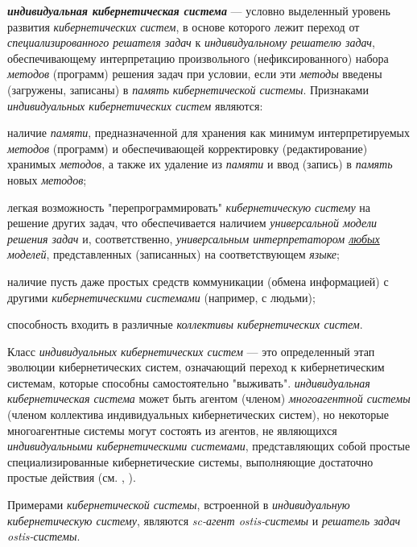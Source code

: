 \textbf{\textit{индивидуальная кибернетическая система}} --- условно выделенный уровень развития \textit{кибернетических систем}, в основе которого лежит переход от \textit{специализированного решателя задач} к \textit{индивидуальному решателю задач}, обеспечивающему интерпретацию произвольного (нефиксированного) набора \textit{методов} (программ) решения задач при условии, если эти \textit{методы} введены (загружены, записаны) в \textit{память} \textit{кибернетической системы}.
Признаками \textit{индивидуальных кибернетических систем} являются:
\begin{textitemize}
    \item наличие \textit{памяти}, предназначенной для хранения как минимум интерпретируемых \textit{методов}	(программ)  и обеспечивающей корректировку (редактирование) хранимых \textit{методов}, а также их удаление из	\textit{памяти} и ввод (запись) в \textit{память} новых \textit{методов};
    \item легкая возможность "перепрограммировать"{} \textit{кибернетическую систему} на решение других задач, что обеспечивается наличием \textit{универсальной модели решения задач} и, соответственно, \textit{универсальным интерпретатором \uline{любых} моделей}, представленных (записанных) на соответствующем \textit{языке};
    \item наличие пусть даже простых средств коммуникации (обмена информацией) с другими \textit{кибернетическими системами} (например, с людьми);
    \item способность входить в различные \textit{коллективы кибернетических систем}.
\end{textitemize}

Класс \textit{индивидуальных кибернетических систем} — это определенный этап эволюции кибернетических систем, означающий переход к кибернетическим системам, которые способны самостоятельно "выживать"{}. \textit{индивидуальная кибернетическая система} может быть агентом (членом) \textit{многоагентной системы} (членом коллектива индивидуальных кибернетических систем), но некоторые многоагентные системы могут состоять из агентов, не являющихся \textit{индивидуальными кибернетическими системами}, представляющих собой простые специализированные кибернетические системы, выполняющие достаточно простые действия (см. , ).

Примерами \textit{кибернетической системы}, встроенной в \textit{индивидуальную кибернетическую систему}, являются \textit{sc-агент ostis-системы} и \textit{решатель задач ostis-системы}.

